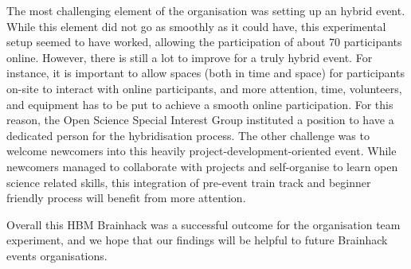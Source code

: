 \documentclass[10pt,a4paper,twocolumns]{proc}
\begin{document}
The most challenging element of the organisation was setting up an
hybrid event. While this element did not go as smoothly as it could
have, this experimental setup seemed to have worked, allowing the
participation of about 70 participants online. However, there is still a
lot to improve for a truly hybrid event. For instance, it is important
to allow spaces (both in time and space) for participants on-site to
interact with online participants, and more attention, time, volunteers,
and equipment has to be put to achieve a smooth online participation.
For this reason, the Open Science Special Interest Group instituted a
position to have a dedicated person for the hybridisation process. The
other challenge was to welcome newcomers into this heavily
project-development-oriented event. While newcomers managed to
collaborate with projects and self-organise to learn open science
related skills, this integration of pre-event train track and beginner
friendly process will benefit from more attention.

Overall this HBM Brainhack was a successful outcome for the organisation
team experiment, and we hope that our findings will be helpful to future
Brainhack events organisations.

\printbibliography
\end{document}
